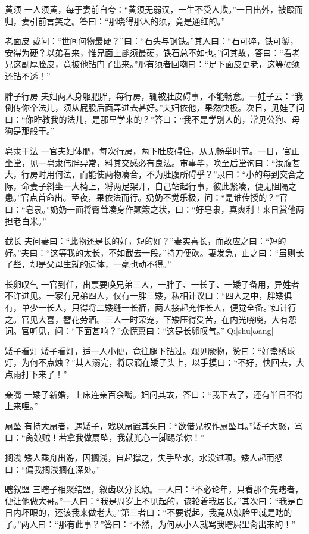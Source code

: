 \documentclass[12pt,UTF8]{ctexbook}
\begin{document}
黄须
一人须黄，每于妻前自夸：“黄须无弱汉，一生不受人欺。”一日出外，被殴而归，妻引前言笑之。答曰：“那晓得那人的须，竟是通红的。”

老面皮
或问：“世间何物最硬？”曰：“石头与钢铁。”其人曰：“石可碎，铁可錾，安得为硬？以弟看来，惟兄面上髭须最硬，铁石总不如也。”问其故，答曰：“看老兄这副厚脸皮，竟被他钻门了出来。”那有须者回嘲曰：“足下面皮更老，这等硬须还钻不透！”

胖子行房
夫妇两人身躯肥胖，每行房，辄被肚皮碍事，不能畅意。一娃子云：“我倒传你个法儿，须从屁股后面弄进去甚好。”夫妇依他，果然快极。次日，见娃子问曰：“你昨教我的法儿，是那里学来的？”答曰：“我不是学别人的，常见公狗、母狗是那般干。”

皂隶干法
一官夫妇体肥，每次行房，两下肚皮碍住，从无畅举时节。一日，官正坐堂，见一皂隶伟胖异常，料其交感必有良法。审事毕，唤至后堂询曰：“汝腹甚大，行房时用何法，而能使两物凑合，不为肚腹所碍乎？”隶曰：“小的每到交合之际，命妻子斜坐一大椅上，将两足架开，自己站起行事，彼此紧凑，便无阻隔之患。”官点首命出。至夜，果依法而行。奶奶不觉乐极，问：“是谁传授的？”官曰：“皂隶。”奶奶一面将臀耸凑身作颠簸之状，曰：“好皂隶，真爽利！来日赏他两担老白米。”

截长
夫问妻曰：“此物还是长的好，短的好？”妻实喜长，而故应之曰：“短的好。”夫曰：“这等我的太长，不如截去一段。”持刀便砍。妻发急，止之曰：“虽则长了些，却是父母生就的遗体，一毫也动不得。”

长卵叹气
一官到任，出票要唤兄弟三人，一胖子、一长子、一矮子备用，异姓者不许进见。一家有兄弟四人，仅有一胖三矮，私相计议曰：“四人之中，胖矮俱有，单少一长人，只得将二矮缝一长裤，两人接起充作长人，便觉全备。”如计行之。官见大喜，簪花劳酒。三人一时荣宠，下矮压得受苦，在内光哓哓，大有怨词。官听见，问：“下面甚响？”众慌禀曰：“这是长卵叹气。”|Qī|shu|ωang|

矮子看灯
矮子看灯，适一人小便，竟往腿下钻过。观见厥物，赞曰：“好盏绣球灯，为何不点烛？”其人溺完，将尿滴在矮子头上，以手摸曰：“不好，快回去，大点雨打下来了！”

亲嘴
一矮子新婚，上床连亲百余嘴。妇问其故，答曰：“我下去了，还有半日不得上来哩。”

扇坠
有持大扇者，遇矮子，戏以扇置其头曰：“欲借兄权作扇坠耳。”矮子大怒，骂曰：“肏娘贼！若拿我做扇坠，我就兜心一脚踢杀你！”

搁浅
矮人乘舟出游，因搁浅，自起撑之，失手坠水，水没过项。矮人起而怒曰：“偏我搁浅搁在深处。”

瞎叙盟
三瞎子相聚结盟，叙齿以分长幼。一人曰：“不必论年，只看那个先瞎者，便让他做大哥。”一人曰：“我是周岁上不见起的，该轮着我居长。”其次曰：“我是百日内坏眼的，还该我来做老大。”第三者曰：“不要说起，我竟从娘胎里就是瞎的了。”两人曰：“那有此事？”答曰：“不然，为何从小人就骂我瞎屄里肏出来的！”
\end{document}
